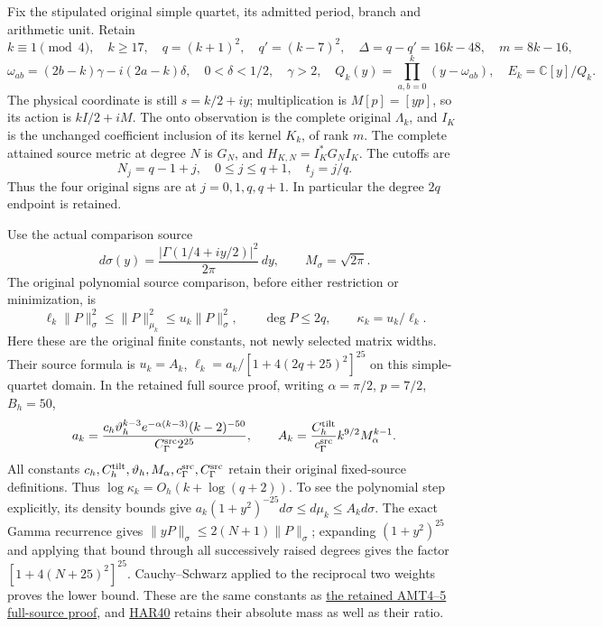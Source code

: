 \documentclass[10pt]{article}
\begin{document}
Fix the stipulated original simple quartet, its admitted period, branch and arithmetic unit. Retain \[
k\equiv1\pmod4,\quad k\ge17,\quad q=(k+1)^2,\quad q'=(k-7)^2,
\quad\Delta=q-q'=16k-48,\quad m=8k-16,
\] \[
\omega_{ab}=(2b-k)\gamma-i(2a-k)\delta,\quad
0<\delta<1/2,\quad\gamma>2,\quad
Q_k(y)=\prod_{a,b=0}^k(y-\omega_{ab}),\quad E_k=\mathbb C[y]/Q_k.
\tag{LX1}
\] The physical coordinate is still \(s=k/2+iy\); multiplication is \(M[p]=[yp]\), so its action is \(kI/2+iM\). The onto observation is the complete original \(\Lambda_k\), and \(I_K\) is the unchanged coefficient inclusion of its kernel \(K_k\), of rank \(m\). The complete attained source metric at degree \(N\) is \(G_N\), and \(H_{K,N}=I_K^*G_NI_K\). The cutoffs are \[
N_j=q-1+j,\quad0\le j\le q+1,\quad t_j=j/q.
\tag{LX2}
\] Thus the four original signs are at \(j=0,1,q,q+1\). In particular the degree \(2q\) endpoint is retained.

Use the actual comparison source \[
d\sigma(y)=\frac{|\Gamma(1/4+iy/2)|^2}{2\pi}\,dy,\qquad M_\sigma=\sqrt{2\pi}.
\] The original polynomial source comparison, before either restriction or minimization, is \[
\ell_k\|P\|_\sigma^2\le\|P\|_{\mu_k}^2\le u_k\|P\|_\sigma^2,
\qquad\deg P\le2q,\qquad\kappa_k=u_k/\ell_k.
\tag{LX3}
\] Here these are the original finite constants, not newly selected matrix widths. Their source formula is \(u_k=A_k\), \(\ell_k=a_k/[1+4(2q+25)^2]^{25}\) on this simple-quartet domain. In the retained full source proof, writing \(\alpha=\pi/2\), \(p=7/2\), \(B_h=50\), \[
a_k=\frac{c_h\vartheta_h^{k-3}e^{-\alpha(k-3)}(k-2)^{-50}}
 {C_\Gamma^{\rm src}2^{25}},\qquad
A_k=\frac{C_h^{\rm tilt}}{c_\Gamma^{\rm src}}k^{9/2}M_\alpha^{k-1}.
\] All constants \(c_h,C_h^{\rm tilt},\vartheta_h,M_\alpha,c_\Gamma^{\rm src},C_\Gamma^{\rm src}\) retain their original fixed-source definitions. Thus \(\log\kappa_k=O_h(k+\log(q+2))\). To see the polynomial step explicitly, its density bounds give \(a_k(1+y^2)^{-25}d\sigma\le d\mu_k\le A_kd\sigma\). The exact Gamma recurrence gives \(\|yP\|_\sigma\le2(N+1)\|P\|_\sigma\); expanding \((1+y^2)^{25}\) and applying that bound through all successively raised degrees gives the factor \([1+4(N+25)^2]^{25}\). Cauchy--Schwarz applied to the reciprocal two weights proves the lower bound. These are the same constants as \href{https://github.com/KokunoYumeto/zeta-function-research-reader/blob/1447462732b40b1474bd9a819cf79257f5326ada/workbenches/splitzero-tandem/continuations/20260922-kernel-frequency/RETAINED_COMPLETE_PROOF_SOURCES.tex\#L13402}{the retained AMT4--5 full-source proof}, and \href{https://github.com/KokunoYumeto/zeta-function-research-reader/blob/360d3c1d798da434966d35f7e407fc59c14f234b/workbenches/splitzero-tandem/continuations/20260921-critical-inverse-activation/HARMONIC_PROOFS.md\#L440}{HAR40} retains their absolute mass as well as their ratio.
\end{document}
